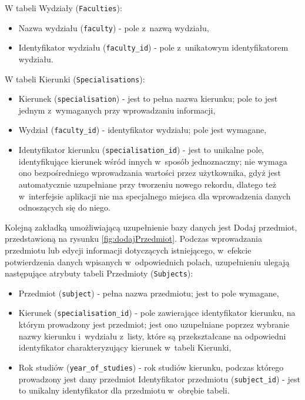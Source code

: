 W tabeli Wydziały (\verb!Faculties!):

\begin{itemize}
\item Nazwa wydziału (\verb!faculty!) - pole z~nazwą wydziału,
\item Identyfikator wydziału (\verb!faculty_id!) - pole z~unikatowym identyfikatorem wydziału.
\end{itemize}

W tabeli Kierunki (\verb!Specialisations!):

\begin{itemize}

\item Kierunek (\verb!specialisation!) - jest to pełna nazwa kierunku; pole to jest jednym z~wymaganych przy wprowadzaniu informacji,
\item Wydział (\verb!faculty_id!) - identyfikator wydziału; pole jest wymagane,
\item Identyfikator kierunku (\verb!specialisation_id!) - jest to unikalne pole, identyfikujące kierunek wśród innych w~sposób jednoznaczny; nie wymaga ono bezpośredniego wprowadzania wartości przez użytkownika, gdyż jest automatycznie uzupełniane przy tworzeniu nowego rekordu, dlatego też w~interfejsie aplikacji nie ma specjalnego miejsca dla wprowadzenia danych odnoszących się do niego.
\end{itemize}
Kolejną zakładką umożliwiającą uzupełnienie bazy danych jest Dodaj przedmiot, przedstawioną na rysunku \ref{fig:dodajPrzedmiot}. Podczas wprowadzania przedmiotu lub edycji informacji dotyczących istniejącego, w~efekcie potwierdzenia danych wpisanych w~odpowiednich polach, uzupełnieniu ulegają następujące atrybuty tabeli Przedmioty (\verb!Subjects!):
\begin{itemize}
\item Przedmiot (\verb!subject!) - pełna nazwa przedmiotu; jest to pole wymagane,
\item Kierunek (\verb!specialisation_id!) - pole zawierające identyfikator kierunku, na którym prowadzony jest przedmiot; jest ono uzupełniane poprzez wybranie nazwy kierunku i~wydziału z~listy, które są przekształcane na odpowiedni identyfikator charakteryzujący kierunek w~tabeli Kierunki,
\item Rok studiów (\verb!year_of_studies!) - rok studiów kierunku, podczas którego prowadzony jest dany przedmiot
Identyfikator przedmiotu (\verb!subject_id!) - jest to unikalny identyfikator dla przedmiotu w~obrębie tabeli.
\end{itemize}

